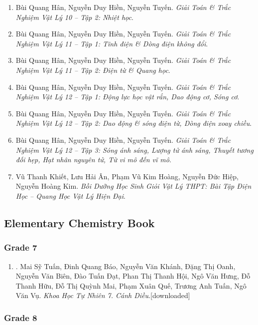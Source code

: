 \documentclass{article}
\begin{document}
\begin{enumerate}
	\item Bùi Quang Hân, Nguyễn Duy Hiền, Nguyễn Tuyến. \textit{Giải Toán \& Trắc Nghiệm Vật Lý 10 -- Tập 2: Nhiệt học}.
	\item Bùi Quang Hân, Nguyễn Duy Hiền, Nguyễn Tuyến. \textit{Giải Toán \& Trắc Nghiệm Vật Lý 11 -- Tập 1: Tĩnh điện \& Dòng điện không đổi}.
	\item Bùi Quang Hân, Nguyễn Duy Hiền, Nguyễn Tuyến. \textit{Giải Toán \& Trắc Nghiệm Vật Lý 11 -- Tập 2: Điện từ \& Quang học}.
	\item Bùi Quang Hân, Nguyễn Duy Hiền, Nguyễn Tuyến. \textit{Giải Toán \& Trắc Nghiệm Vật Lý 12 -- Tập 1: Động lực học vật rắn, Dao động cơ, Sóng cơ}.
	\item Bùi Quang Hân, Nguyễn Duy Hiền, Nguyễn Tuyến. \textit{Giải Toán \& Trắc Nghiệm Vật Lý 12 -- Tập 2: Dao động \& sóng điện từ, Dòng điện xoay chiều}.
	\item Bùi Quang Hân, Nguyễn Duy Hiền, Nguyễn Tuyến. \textit{Giải Toán \& Trắc Nghiệm Vật Lý 12 -- Tập 3: Sóng ánh sáng, Lượng tử ánh sáng, Thuyết tương đối hẹp, Hạt nhân nguyên tử, Từ vi mô đến vĩ mô}.
	\item Vũ Thanh Khiết, Lưu Hải Ân, Phạm Vũ Kim Hoàng, Nguyễn Đức Hiệp, Nguyễn Hoàng Kim. \textit{Bồi Dưỡng Học Sinh Giỏi Vật Lý THPT: Bài Tập Điện Học -- Quang Học Vật Lý Hiện Đại}.
\end{enumerate}

\subsection{Elementary Chemistry Book}

\subsubsection{Grade 7}

\begin{enumerate}
	\item \cite{SGK_KHTN_7_Canh_Dieu}. Mai Sỹ Tuấn, Đinh Quang Báo, Nguyễn Văn Khánh, Đặng Thị Oanh, Nguyễn Văn Biên, Đào Tuấn Đạt, Phan Thị Thanh Hội, Ngô Văn Hưng, Đỗ Thanh Hữu, Đỗ Thị Quỳnh Mai, Phạm Xuân Quế, Trương Anh Tuấn, Ngô Văn Vụ. \textit{Khoa Học Tự Nhiên 7. Cánh Diều}.\hfill\textsf{[downloaded]}
\end{enumerate}

\subsubsection{Grade 8}
\end{document}
